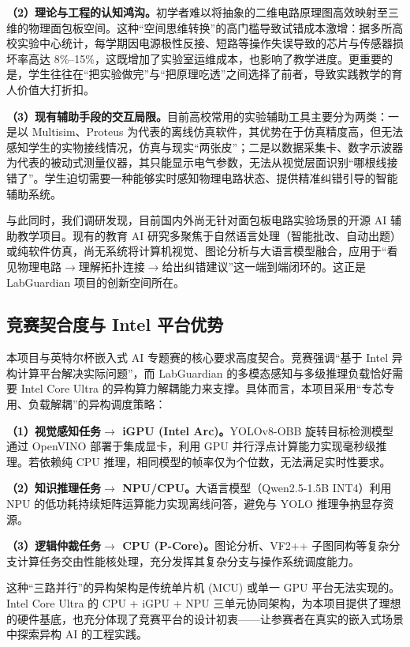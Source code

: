 \documentclass[a4paper,12pt,fontset=ubuntu]{ctexart}
\begin{document}
\textbf{（2）理论与工程的认知鸿沟。}初学者难以将抽象的二维电路原理图高效映射至三维的物理面包板空间。这种“空间思维转换”的高门槛导致试错成本激增：据多所高校实验中心统计，每学期因电源极性反接、短路等操作失误导致的芯片与传感器损坏率高达 8\%–15\%，这既增加了实验室运维成本，也影响了教学进度。更重要的是，学生往往在“把实验做完”与“把原理吃透”之间选择了前者，导致实践教学的育人价值大打折扣。

\textbf{（3）现有辅助手段的交互局限。}目前高校常用的实验辅助工具主要分为两类：一是以 Multisim、Proteus 为代表的离线仿真软件，其优势在于仿真精度高，但无法感知学生的实物接线情况，仿真与现实“两张皮”；二是以数据采集卡、数字示波器为代表的被动式测量仪器，其只能显示电气参数，无法从视觉层面识别“哪根线接错了”。学生迫切需要一种能够实时感知物理电路状态、提供精准纠错引导的智能辅助系统。

与此同时，我们调研发现，目前国内外尚无针对面包板电路实验场景的开源 AI 辅助教学项目。现有的教育 AI 研究多聚焦于自然语言处理（智能批改、自动出题）或纯软件仿真，尚无系统将计算机视觉、图论分析与大语言模型融合，应用于“看见物理电路$\rightarrow$理解拓扑连接$\rightarrow$给出纠错建议”这一端到端闭环的。这正是 LabGuardian 项目的创新空间所在。

\subsection{竞赛契合度与 Intel 平台优势}

本项目与英特尔杯嵌入式 AI 专题赛的核心要求高度契合。竞赛强调“基于 Intel 异构计算平台解决实际问题”，而 LabGuardian 的多模态感知与多级推理负载恰好需要 Intel Core Ultra 的异构算力解耦能力来支撑。具体而言，本项目采用“专芯专用、负载解耦”的异构调度策略：

\textbf{（1）视觉感知任务$\rightarrow$ iGPU (Intel Arc)。}YOLOv8-OBB 旋转目标检测模型通过 OpenVINO 部署于集成显卡，利用 GPU 并行浮点计算能力实现毫秒级推理。若依赖纯 CPU 推理，相同模型的帧率仅为个位数，无法满足实时性要求。

\textbf{（2）知识推理任务$\rightarrow$ NPU/CPU。}大语言模型（Qwen2.5-1.5B INT4）利用 NPU 的低功耗持续矩阵运算能力实现离线问答，避免与 YOLO 推理争抐显存资源。

\textbf{（3）逻辑仲裁任务$\rightarrow$ CPU (P-Core)。}图论分析、VF2++ 子图同构等复杂分支计算任务交由性能核处理，充分发挥其复杂分支与操作系统调度能力。

这种“三路并行”的异构架构是传统单片机 (MCU) 或单一 GPU 平台无法实现的。Intel Core Ultra 的 CPU + iGPU + NPU 三单元协同架构，为本项目提供了理想的硬件基底，也充分体现了竞赛平台的设计初衷——让参赛者在真实的嵌入式场景中探索异构 AI 的工程实践。
\end{document}
